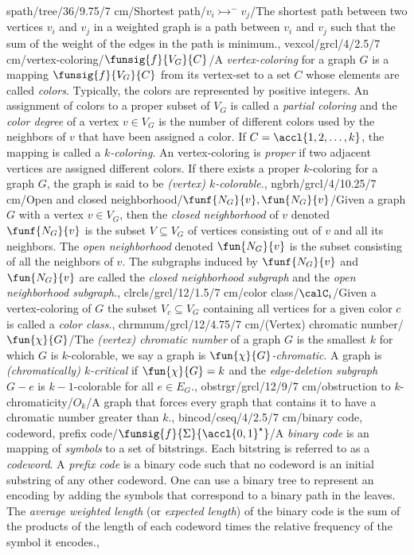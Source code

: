 spath/tree/36/9.75/7 cm/{Shortest path}/{$v_i\rightarrowtail^{-} v_j$}/{The shortest path between two vertices $v_i$ and $v_j$ in a weighted graph is a path between $v_i$ and $v_j$ such that the sum of the weight of the edges in the path is minimum.},%
vexcol/grcl/4/2.5/7 cm/{vertex-coloring}/{$\funsig{f}{V_G}{C}$}/{A \emph{vertex-coloring} for a graph $G$ is a mapping $\funsig{f}{V_G}{C}$ from its vertex-set to a set $C$ whose elements are called \emph{colors}. Typically, the colors are represented by positive integers. An assignment of colors to a proper subset of $V_G$ is called a \emph{partial coloring} and the \emph{color degree} of a vertex $v\in V_G$ is the number of different colors used by the neighbors of $v$ that have been assigned a color. If $C=\accl{1,2,\ldots,k}$, the mapping is called a \emph{$k$-coloring}. An vertex-coloring is \emph{proper} if two adjacent vertices are assigned different colors. If there exists a proper $k$-coloring for a graph $G$, the graph is said to be \emph{(vertex) $k$-colorable}.},
ngbrh/grcl/4/10.25/7 cm/{Open and closed neighborhood}/{$\funf{N_G}{v},\fun{N_G}{v}$}/{Given a graph $G$ with a vertex $v\in V_G$, then the \emph{closed neighborhood} of $v$ denoted $\funf{N_G}{v}$ is the subset $V\subseteq V_G$ of vertices consisting out of $v$ and all its neighbors. The \emph{open neighborhood} denoted $\fun{N_G}{v}$ is the subset consisting of all the neighbors of $v$. The subgraphs induced by $\funf{N_G}{v}$ and $\fun{N_G}{v}$ are called the \emph{closed neighborhood subgraph} and the \emph{open neighborhood subgraph}.},
clrcls/grcl/12/1.5/7 cm/{color class}/{$\calC_i$}/{Given a vertex-coloring of $G$ the subset $V_c\subseteq V_G$ containing all vertices for a given color $c$ is called a \emph{color class}.},
chrmnum/grcl/12/4.75/7 cm/{(Vertex) chromatic number}/{$\fun{\chi}{G}$}/{The \emph{(vertex) chromatic number} of a graph $G$ is the smallest $k$ for which $G$ is $k$-colorable, we say a graph is \emph{$\fun{\chi}{G}$-chromatic}. A graph is \emph{(chromatically) $k$-critical} if $\fun{\chi}{G}=k$ and the \emph{edge-deletion subgraph} $G-e$ is $k-1$-colorable for all $e\in E_G$.},
obstrgr/grcl/12/9/7 cm/{obstruction to $k$-chromaticity}/{$O_k$}/{A graph that forces every graph that contains it to have a chromatic number greater than $k$.},
bincod/cseq/4/2.5/7 cm/{binary code, codeword, prefix code}/{$\funsig{f}{\Sigma}{\accl{0,1}^{\star}}$}/{A \emph{binary code} is an mapping of \emph{symbols} to a set of bitstrings. Each bitstring is referred to as a \emph{codeword}. A \emph{prefix code} is a binary code such that no codeword is an initial substring of any other codeword. One can use a binary tree to represent an encoding by adding the symbols that correspond to a binary path in the leaves. The \emph{average weighted length} (or \emph{expected length}) of the binary code is the sum of the products of the length of each codeword times the relative frequency of the symbol it encodes.},
